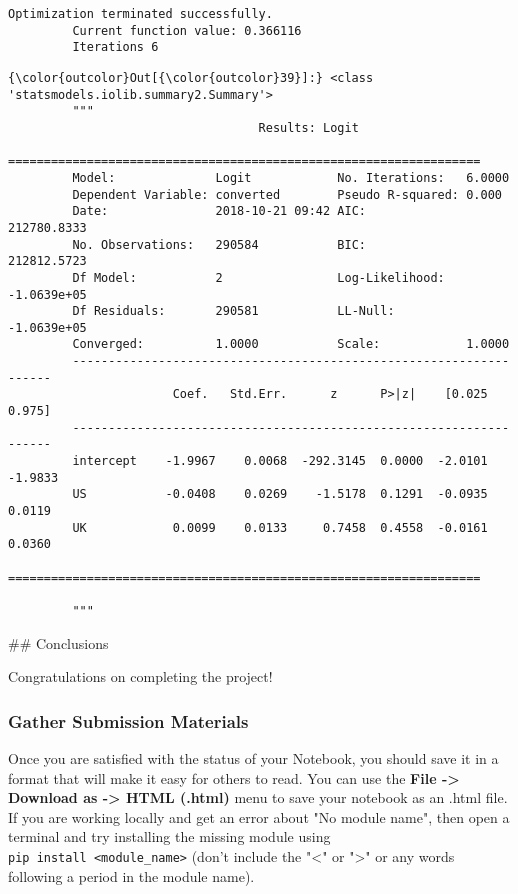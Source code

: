 \documentclass[11pt]{article}
\begin{document}
    \begin{Verbatim}[commandchars=\\\{\}]
Optimization terminated successfully.
         Current function value: 0.366116
         Iterations 6

    \end{Verbatim}

\begin{Verbatim}[commandchars=\\\{\}]
{\color{outcolor}Out[{\color{outcolor}39}]:} <class 'statsmodels.iolib.summary2.Summary'>
         """
                                   Results: Logit
         ==================================================================
         Model:              Logit            No. Iterations:   6.0000     
         Dependent Variable: converted        Pseudo R-squared: 0.000      
         Date:               2018-10-21 09:42 AIC:              212780.8333
         No. Observations:   290584           BIC:              212812.5723
         Df Model:           2                Log-Likelihood:   -1.0639e+05
         Df Residuals:       290581           LL-Null:          -1.0639e+05
         Converged:          1.0000           Scale:            1.0000     
         -------------------------------------------------------------------
                       Coef.   Std.Err.      z      P>|z|    [0.025   0.975]
         -------------------------------------------------------------------
         intercept    -1.9967    0.0068  -292.3145  0.0000  -2.0101  -1.9833
         US           -0.0408    0.0269    -1.5178  0.1291  -0.0935   0.0119
         UK            0.0099    0.0133     0.7458  0.4558  -0.0161   0.0360
         ==================================================================
         
         """
\end{Verbatim}
            
     \#\# Conclusions

Congratulations on completing the project!

\subsubsection{Gather Submission
Materials}\label{gather-submission-materials}

Once you are satisfied with the status of your Notebook, you should save
it in a format that will make it easy for others to read. You can use
the \textbf{File -\textgreater{} Download as -\textgreater{} HTML
(.html)} menu to save your notebook as an .html file. If you are working
locally and get an error about "No module name", then open a terminal
and try installing the missing module using
\texttt{pip\ install\ \textless{}module\_name\textgreater{}} (don't
include the "\textless{}" or "\textgreater{}" or any words following a
period in the module name).
\end{document}

